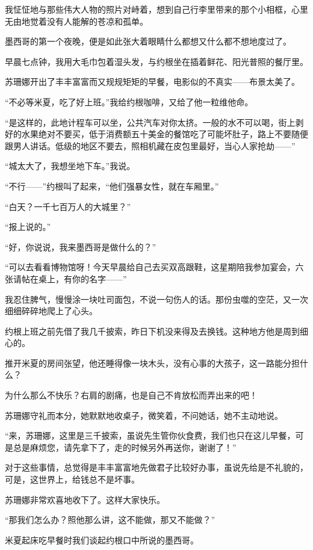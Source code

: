 \par 我怔怔地与那些伟大人物的照片对峙着，想到自己行李里带来的那个小相框，心里无由地觉着没有人能解的苍凉和孤单。
\par 墨西哥的第一个夜晚，便是如此张大着眼睛什么都想又什么都不想地度过了。
\par   
\par 早晨七点钟，我用大毛巾包着湿头发，与约根坐在插着鲜花、阳光普照的餐厅里。
\par 苏珊娜开出了丰丰富富而又规规矩矩的早餐，电影似的不真实——布景太美了。
\par “不必等米夏，吃了好上班。”我给约根咖啡，又给了他一粒维他命。
\par “是这样的，此地计程车可以坐，公共汽车对你太挤。一般的水不可以喝，街上剥好的水果绝对不要买，低于消费额五十美金的餐馆吃了可能坏肚子，路上不要随便跟男人讲话。低级的地区不要去，照相机藏在皮包里最好，当心人家抢劫——”
\par “城太大了，我想坐地下车。”我说。
\par “不行——”约根叫了起来，“他们强暴女性，就在车厢里。”
\par “白天？一千七百万人的大城里？”
\par “报上说的。”
\par “好，你说说，我来墨西哥是做什么的？”
\par “可以去看看博物馆呀！今天早晨给自己去买双高跟鞋，这星期陪我参加宴会，六张请帖在桌上，有你的名字——”
\par 我忍住脾气，慢慢涂一块吐司面包，不说一句伤人的话。那份虫噬的空茫，又一次细细碎碎地爬上了心头。
\par 约根上班之前先借了我几千披索，昨日下机没来得及去换钱。这种地方他是周到细心的。
\par 推开米夏的房间张望，他还睡得像一块木头，没有心事的大孩子，这一路能分担什么？
\par 为什么那么不快乐？右肩的剧痛，也是自己不肯放松而弄出来的吧！
\par 苏珊娜守礼而本分，她默默地收桌子，微笑着，不问她话，她不主动地说。
\par “来，苏珊娜，这里是三千披索，虽说先生管你伙食费，我们也只在这儿早餐，可是总是麻烦您，请先拿下了，走的时候另外再送你，谢谢了！”
\par 对于这些事情，总觉得是丰丰富富地先做君子比较好办事，虽说先给是不礼貌的，可是，这世界上，给钱总不是坏事。
\par 苏珊娜非常欢喜地收下了。这样大家快乐。
\par  
\par “那我们怎么办？照他那么讲，这不能做，那又不能做？”
\par 米夏起床吃早餐时我们谈起约根口中所说的墨西哥。
